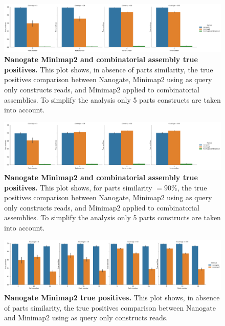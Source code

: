 \documentclass[11pt, a4paper]{article}
\begin{document}
  \begin{figure}[ht]
    \begin{center}
    \includegraphics[width=1.35\textwidth]{../results/images_notebook/v_400/sim_00_5_parts_true_positives_comparison.pdf}
    \end{center}
    \caption{{\bf Nanogate Minimap2 and combinatorial assembly true positives.}  This plot shows, in absence of parts similarity, the true positives comparison between Nanogate, Minimap2 using as query only constructs reads, and Minimap2 applied to combinatorial assemblies. To simplify the analysis only 5 parts constructs are taken into account.}
   \label{fig:v_400_sim_00_5_parts_true_positives_comparison}
\end{figure}

  \begin{figure}[ht]
    \begin{center}
    \includegraphics[width=1.35\textwidth]{../results/images_notebook/v_400/sim_09_5_parts_true_positives_comparison.pdf}
    \end{center}
    \caption{{\bf Nanogate Minimap2 and combinatorial assembly true positives.}  This plot shows, for parts similarity $=90\%$, the true positives comparison between Nanogate, Minimap2 using as query only constructs reads, and Minimap2 applied to combinatorial assemblies. To simplify the analysis only 5 parts constructs are taken into account.}
   \label{fig:v_400_sim_90_5_parts_true_positives_comparison}
\end{figure}

  \begin{figure}[ht]
    \begin{center}
    \includegraphics[width=1.35\textwidth]{../results/images_notebook/v_400/sim_00_minimap2_nanogate_true_positives_comparison.pdf}
    \end{center}
    \caption{{\bf Nanogate Minimap2 true positives.}  This plot shows, in absence of parts similarity, the true positives comparison between Nanogate and Minimap2 using as query only constructs reads.}
   \label{fig:v_400_sim_00_true_positives_comparison}
\end{figure}
\end{document}
